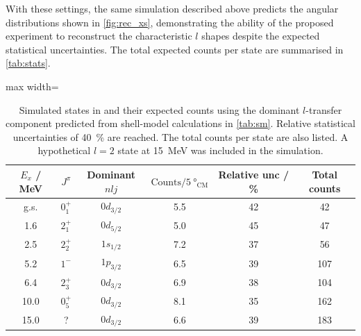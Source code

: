 \documentclass[a4paper, 10pt]{article}
\newcommand{\iso}[2]{\ce{^{#1}#2}}
\begin{document}
With these settings, the same simulation described above predicts the angular distributions shown in \autoref{fig:rec_xs}, demonstrating the ability of the proposed experiment to reconstruct the characteristic $l$ shapes despite the expected statistical uncertainties. The total expected counts per state are summarised in \autoref{tab:stats}.
\begin{table}[!htbp]
    \centering
    \begin{minipage}[t]{0.56\linewidth}
        \centering
        \begin{adjustbox}{max width=\linewidth}
        \begin{tabular}{@{}cccccc@{}}
            \toprule
            {$E_{x}$ / MeV} & $J^{\pi}$ & {Dominant $nlj$} & {$\text{Counts} / \qty{5}{\degree}_{\text{CM}}$} & Relative unc / \unit{\percent} & {Total counts} \\ \midrule
            g.s.            & $0^+_1$   & $0d_{3/2}$               & 5.5                                              & 42                             & 42             \\
            1.6             & $2^+_1$   & $0d_{5/2}$               & 5.0                                              & 45                             & 47             \\
            2.5             & $2^+_2$   & $1s_{1/2}$               & 7.2                                              & 37                             & 56             \\
            5.2             & $1^-$     & $1p_{3/2}$               & 6.5                                              & 39                             & 107            \\
            6.4             & $2^+_3$   & $0d_{3/2}$               & 6.9                                              & 38                             & 104            \\
            10.0            & $0^+_5$   & $0d_{3/2}$               & 8.1                                              & 35                             & 162            \\
            15.0            & ?         & $0d_{3/2}$               & 6.6                                              & 39                             & 183            \\
            \bottomrule
        \end{tabular}
        \end{adjustbox}
        \caption{Simulated states in \iso{18}{C} and their expected counts using the dominant $l$-transfer component predicted from shell-model calculations in \autoref{tab:sm}. Relative statistical uncertainties of \qty{40}{\percent} are reached. The total counts per state are also listed. A hypothetical $l=2$ state at \qty{15}{\MeV} was included in the simulation.}

\end{minipage}
\end{table}
\end{document}
